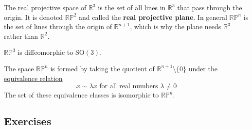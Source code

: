   \begin{example}
    \label{ex:the-real-projective-plane}
    The real projective space of $\mathbb{R}^3$ is the set of all lines in $\mathbb{R}^3$ that pass through the origin. It is denoted $\mathbb{R P}^2$ and called the \textbf{real projective plane}. In general $\mathbb{RP}^n$ is the set of lines through the origin of $\mathbb{R}^{n+1}$, which is why the plane needs $\mathbb{R}^3$ rather than $\mathbb{R}^2$. 
  \end{example}

  \begin{example}
    \label{ex:rp3-is-diffeomorphic-to-so3}
    $\mathbb{RP}^3$ is diffeomorphic to SO$(3)$. 
  \end{example}

  \begin{example}
    \label{ex:rpn-as-a-quotient-of-rn1setminus0}
    The space $\mathbb{RP}^n$ is formed by taking the quotient of $\mathbb{R}^{n+1} \setminus \{0\}$ under the \hyperref[st-def:equivalence_relation]{equivalence relation} 
    \begin{equation}
      x \sim \lambda x \text{ for all real numbers } \lambda \neq 0
    \end{equation}
    The set of these equivalence classes is isomorphic to $\mathbb{RP}^n$. 
  \end{example}

\subsection{Exercises}


